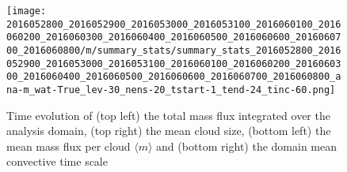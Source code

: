 \documentclass[a4paper, 12pt]{article}
\begin{document}

\begin{figure}[ht] \label{fig:comp_summary_stats}
\noindent \centering
\texttt{[image: 2016052800\_2016052900\_2016053000\_2016053100\_2016060100\_2016060200\_2016060300\_2016060400\_2016060500\_2016060600\_2016060700\_2016060800/m/summary\_stats/summary\_stats\_2016052800\_2016052900\_2016053000\_2016053100\_2016060100\_2016060200\_2016060300\_2016060400\_2016060500\_2016060600\_2016060700\_2016060800\_ana-m\_wat-True\_lev-30\_nens-20\_tstart-1\_tend-24\_tinc-60.png]}\\
\caption{Time evolution of (top left) the total mass flux integrated over the analysis domain, (top right) the mean cloud size, (bottom left) the mean mass flux per cloud $\langle m \rangle$ and (bottom right) the domain mean convective time scale}
\end{figure}
\end{document}

